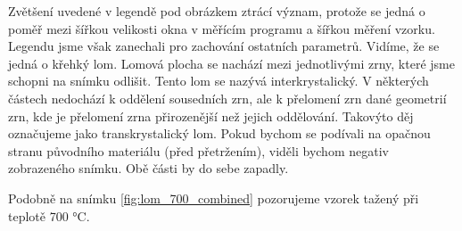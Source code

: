 Zvětšení uvedené v legendě pod obrázkem ztrácí význam, protože se jedná o poměř mezi šířkou velikosti okna v měřícím programu a šířkou měření vzorku. Legendu jsme však zanechali pro zachování ostatních parametrů. Vidíme, že se jedná o křehký lom. Lomová plocha se nachází mezi jednotlivými zrny, které jsme schopni na snímku odlišit. Tento lom se nazývá interkrystalický. V některých částech nedochází k oddělení sousedních zrn, ale k přelomení zrn dané geometrií zrn, kde je přelomení zrna přirozenější než jejich oddělování. Takovýto děj označujeme jako transkrystalický lom. Pokud bychom se podívali na opačnou stranu původního materiálu (před přetržením), viděli bychom negativ zobrazeného snímku. Obě části by do sebe zapadly.

Podobně na snímku \ref{fig:lom_700_combined} pozorujeme vzorek tažený při teplotě 700 °C.

